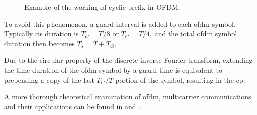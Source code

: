\begin{figure}[H]
	\centering
	
	\vspace{0.5cm}
	
	\caption[]{Example of the working of cyclic prefix in OFDM.}
	\label{fig:OFDM_cyclic prefix}
\end{figure}

To avoid this phenomenon, a guard interval is added to each \gls{ofdm} symbol. Typically its duration is $T_G = T/8$ or $T_G = T/4$, and the total \gls{ofdm} symbol duration then becomes $T_s = T + T_G$.

Due to the circular property of the discrete inverse Fourier transform, extending the time duration of the \gls{ofdm} symbol by a guard time is equivalent to prepending a copy of the last $T_G/T$ portion of the symbol, resulting in the \gls{cp}.


A more thorough theoretical examination of \gls{ofdm}, multicarrier communications and their applications can be found in \cite{OFDMWireless} and \cite{Proakis_2001}.


